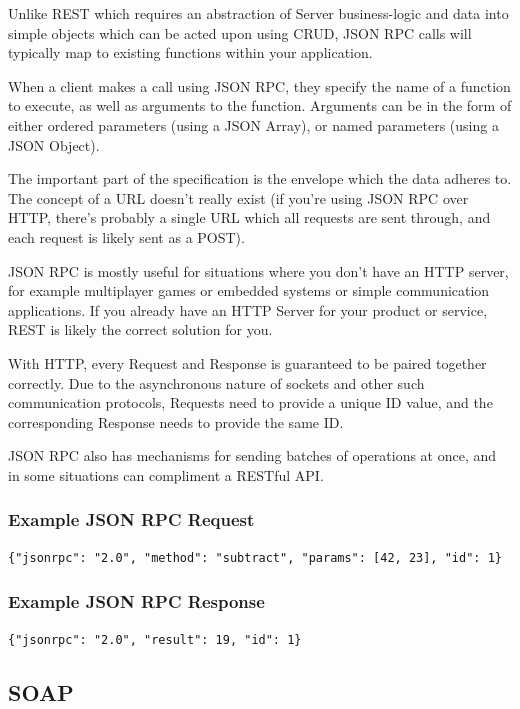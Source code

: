 \documentclass{book}
\begin{document}
Unlike REST which requires an abstraction of Server business-logic and data into simple objects which can be acted upon using CRUD, JSON RPC calls will typically map to existing functions within your application.

When a client makes a call using JSON RPC, they specify the name of a function to execute, as well as arguments to the function. Arguments can be in the form of either ordered parameters (using a JSON Array), or named parameters (using a JSON Object).

The important part of the specification is the envelope which the data adheres to. The concept of a URL doesn't really exist (if you're using JSON RPC over HTTP, there's probably a single URL which all requests are sent through, and each request is likely sent as a POST).

JSON RPC is mostly useful for situations where you don't have an HTTP server, for example multiplayer games or embedded systems or simple communication applications. If you already have an HTTP Server for your product or service, REST is likely the correct solution for you.

With HTTP, every Request and Response is guaranteed to be paired together correctly. Due to the asynchronous nature of sockets and other such communication protocols, Requests need to provide a unique ID value, and the corresponding Response needs to provide the same ID.

JSON RPC also has mechanisms for sending batches of operations at once, and in some situations can compliment a RESTful API.

\subsubsection{Example JSON RPC Request}

\begin{verbatim}
{"jsonrpc": "2.0", "method": "subtract", "params": [42, 23], "id": 1}
\end{verbatim}

\subsubsection{Example JSON RPC Response}

\begin{verbatim}
{"jsonrpc": "2.0", "result": 19, "id": 1}
\end{verbatim}


\subsection{SOAP}
\end{document}
